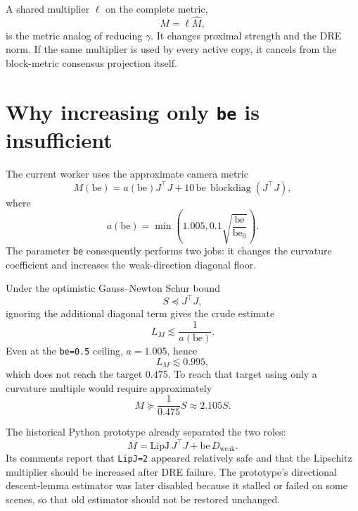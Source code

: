 \documentclass[11pt]{article}
\begin{document}
A shared multiplier $\ell$ on the complete metric,
\[
  M=\ell\widehat M,
\]
is the metric analog of reducing $\gamma$. It changes proximal strength and
the DRE norm. If the same multiplier is used by every active copy, it cancels
from the block-metric consensus projection itself.

\section{Why increasing only \texttt{be} is insufficient}

The current worker uses the approximate camera metric
\begin{equation}
  M(\mathrm{be})
  =a(\mathrm{be})J^\top J
   +10\,\mathrm{be}\,\operatorname{blockdiag}(J^\top J),
  \label{eq:current-metric}
\end{equation}
where
\begin{equation}
  a(\mathrm{be})
  =\min\left(
    1.005,
    0.1\sqrt{\frac{\mathrm{be}}{\mathrm{be}_0}}
  \right).
\end{equation}
The parameter \texttt{be} consequently performs two jobs: it changes the
curvature coefficient and increases the weak-direction diagonal floor.

Under the optimistic Gauss--Newton Schur bound
\[
  S\preceq J^\top J,
\]
ignoring the additional diagonal term gives the crude estimate
\begin{equation}
  L_M\lesssim\frac{1}{a(\mathrm{be})}.
  \label{eq:crude-bound}
\end{equation}
Even at the \texttt{be=0.5} ceiling, $a=1.005$, hence
\[
  L_M\lesssim0.995,
\]
which does not reach the target $0.475$. To reach that target using only a
curvature multiple would require approximately
\begin{equation}
  M\succeq\frac{1}{0.475}S
  \approx2.105S.
  \label{eq:target-curvature-multiple}
\end{equation}

The historical Python prototype already separated the two roles:
\begin{equation}
  M=\mathrm{LipJ}\,J^\top J
    +\mathrm{be}\,D_{\mathrm{weak}}.
  \label{eq:historical-metric}
\end{equation}
Its comments report that \texttt{LipJ=2} appeared relatively safe and that
the Lipschitz multiplier should be increased after DRE failure. The prototype's
directional descent-lemma estimator was later disabled because it stalled or
failed on some scenes, so that old estimator should not be restored unchanged.
\end{document}
